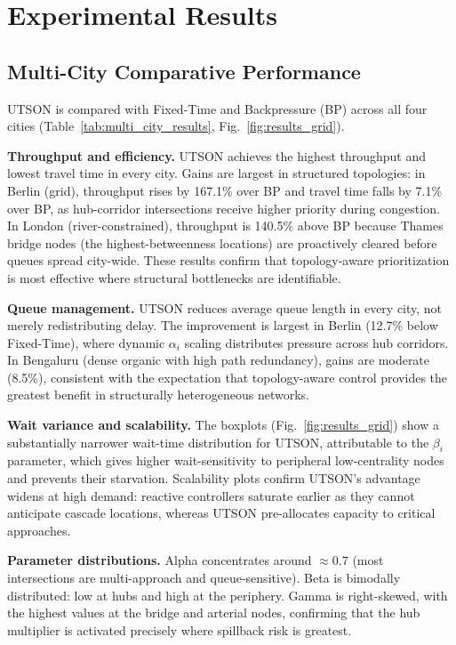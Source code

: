 \documentclass[letterpaper, conference]{IEEEtran}
\begin{document}
\section{Experimental Results}
\label{section_exp_res}
\subsection{Multi-City Comparative Performance}
UTSON is compared with Fixed-Time and Backpressure (BP) across all four cities (Table~\ref{tab:multi_city_results}, Fig.~\ref{fig:results_grid}).

\textbf{Throughput and efficiency.} UTSON achieves the highest throughput and lowest travel time in every city. Gains are largest in structured topologies: in Berlin (grid), throughput rises by 167.1\% over BP and travel time falls by 7.1\% over BP, as hub-corridor intersections receive higher priority during congestion. In London (river-constrained), throughput is 140.5\% above BP because Thames bridge nodes (the highest-betweenness locations) are proactively cleared before queues spread city-wide. These results confirm that topology-aware prioritization is most effective where structural bottlenecks are identifiable.

\textbf{Queue management.} UTSON reduces average queue length in every city, not merely redistributing delay. The improvement is largest in Berlin (12.7\% below Fixed-Time), where dynamic $\alpha_i$ scaling distributes pressure across hub corridors. In Bengaluru (dense organic with high path redundancy), gains are moderate (8.5\%), consistent with the expectation that topology-aware control provides the greatest benefit in structurally heterogeneous networks.

\textbf{Wait variance and scalability.} The boxplots (Fig.~\ref{fig:results_grid}) show a substantially narrower wait-time distribution for UTSON, attributable to the $\beta_i$ parameter, which gives higher wait-sensitivity to peripheral low-centrality nodes and prevents their starvation. Scalability plots confirm UTSON's advantage widens at high demand: reactive controllers saturate earlier as they cannot anticipate cascade locations, whereas UTSON pre-allocates capacity to critical approaches.

\textbf{Parameter distributions.} Alpha concentrates around $\approx\!0.7$ (most intersections are multi-approach and queue-sensitive). Beta is bimodally distributed: low at hubs and high at the periphery. Gamma is right-skewed, with the highest values at the bridge and arterial nodes, confirming that the hub multiplier is activated precisely where spillback risk is greatest.
\end{document}

